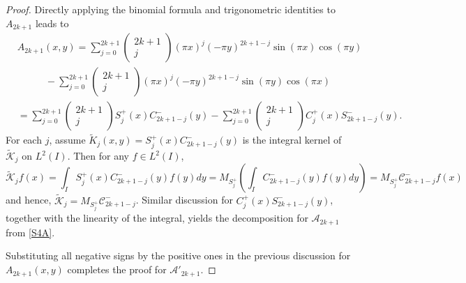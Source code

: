 \documentclass[10pt,a4paper]{amsart}
\begin{document}
\begin{proof}
Directly applying the binomial formula and trigonometric identities to $A_{2k+1}$ leads to
\begin{equation}\label{S4A}
    \begin{split}
        &A_{2k+1}(x,y)=\sum_{j=0}^{2k+1}\left(\begin{matrix}
            2k+1\\j
        \end{matrix}\right)(\pi x)^j(-\pi y)^{2k+1-j}\sin(\pi x)\cos(\pi y)\\&~~~~~~~~~~~~~-\sum_{j=0}^{2k+1}\left(\begin{matrix}
            2k+1\\j
        \end{matrix}\right)(\pi x)^j(-\pi y)^{2k+1-j}\sin(\pi y)\cos(\pi x)\\
        &=\sum_{j=0}^{2k+1}\left(\begin{matrix}
            2k+1\\j
        \end{matrix}\right)S_{j}^+(x)C_{2k+1-j}^{-}(y)-\sum_{j=0}^{2k+1}\left(\begin{matrix}
            2k+1\\j
        \end{matrix}\right)C_{j}^+(x)S_{2k+1-j}^-(y).
    \end{split}
\end{equation}
For each $j$, assume $\tilde{K}_j(x,y)=S_j^+(x)C_{2k+1-j}^-(y)$ is the integral kernel of $\tilde{\mathcal{K}}_{j}$ on $L^2(I)$. Then for any $f\in L^2(I)$, 
\begin{equation*}
    \tilde{\mathcal{K}}_jf(x)=\int_I S_j^+(x)C_{2k+1-j}^-(y)f(y)dy=M_{S_j^+}\left(\int_I C_{2k+1-j}^-(y)f(y)dy\right)=M_{S_j^+}\mathcal{C}_{2k+1-j}^-f(x)
\end{equation*}
and hence, $\tilde{\mathcal{K}}_j=M_{S_j^+}\mathcal{C}_{2k+1-j}^-$. Similar discussion for $C^+_j(x)S_{2k+1-j}^-(y)$, together with the linearity of the integral, yields the decomposition for $\mathcal{A}_{2k+1}$ from \eqref{S4A}.

Substituting all negative signs by the positive ones in the previous discussion for $A_{2k+1}(x,y)$ completes the proof for $\mathcal{A}'_{2k+1}$.
\end{proof}
\end{document}
